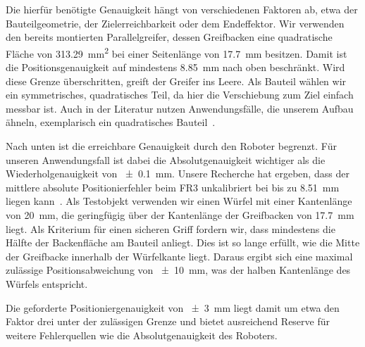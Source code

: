 Die hierfür benötigte Genauigkeit hängt von verschiedenen Faktoren ab, etwa der Bauteilgeometrie, der Zielerreichbarkeit oder dem Endeffektor. Wir verwenden den bereits montierten Parallelgreifer, dessen Greifbacken eine quadratische Fläche von \SI{313,29}{\square\milli\metre} bei einer Seitenlänge von \SI{17,7}{\milli\metre} besitzen. Damit ist die Positionsgenauigkeit auf mindestens \SI{8,85}{\milli\metre} nach oben beschränkt. Wird diese Grenze überschritten, greift der Greifer ins Leere. Als Bauteil wählen wir ein symmetrisches, quadratisches Teil, da hier die Verschiebung zum Ziel einfach messbar ist. Auch in der Literatur nutzen Anwendungsfälle, die unserem Aufbau ähneln, exemplarisch ein quadratisches Bauteil~\cite{Kreis2023PlacementCorrection,Li2020SquarePickPlace}.

Nach unten ist die erreichbare Genauigkeit durch den Roboter begrenzt. Für unseren Anwendungsfall ist dabei die Absolutgenauigkeit wichtiger als die Wiederholgenauigkeit von \SI{\pm 0,1}{\milli\metre}. Unsere Recherche hat ergeben, dass der mittlere absolute Positionierfehler beim FR3 unkalibriert bei bis zu \SI{8,51}{\milli\metre} liegen kann~\cite{Franzese2026Calibration}. Als Testobjekt verwenden wir einen Würfel mit einer Kantenlänge von \SI{20}{\milli\metre}, die geringfügig über der Kantenlänge der Greifbacken von \SI{17,7}{\milli\metre} liegt. Als Kriterium für einen sicheren Griff fordern wir, dass mindestens die Hälfte der Backenfläche am Bauteil anliegt. Dies ist so lange erfüllt, wie die Mitte der Greifbacke innerhalb der Würfelkante liegt. Daraus ergibt sich eine maximal zulässige Positionsabweichung von \SI{\pm 10}{\milli\metre}, was der halben Kantenlänge des Würfels entspricht.


Die geforderte Positioniergenauigkeit von \SI{\pm 3}{\milli\metre} liegt damit um etwa den Faktor drei unter der zulässigen Grenze und bietet ausreichend Reserve für weitere Fehlerquellen wie die Absolutgenauigkeit des Roboters.

